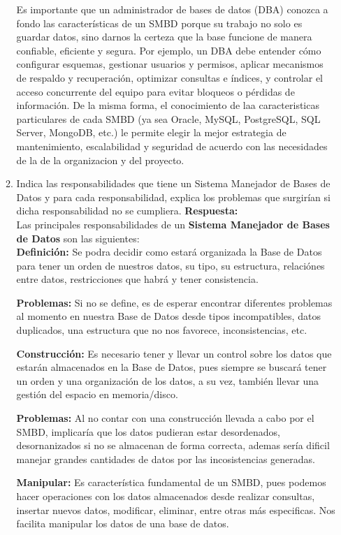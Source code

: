 \documentclass[12pt]{report}
\begin{document}
\begin{enumerate}[label=\textbf{\arabic*.}, leftmargin=*]
\begin{enumerate}[label=\textbf{\alph*.}, leftmargin=*, itemsep=1.0em]
    Es importante que un administrador de bases de datos (DBA) conozca a fondo las características de un SMBD porque su trabajo no solo es guardar datos, sino darnos la certeza que la base funcione de manera confiable, eficiente y segura. Por ejemplo, un DBA debe entender cómo configurar esquemas, gestionar usuarios y permisos, aplicar mecanismos de respaldo y recuperación, optimizar consultas e índices, y controlar el acceso concurrente del equipo para evitar bloqueos o pérdidas de información. De la misma forma, el conocimiento de laa caracteristicas particulares de cada SMBD (ya sea Oracle, MySQL, PostgreSQL, SQL Server, MongoDB, etc.) le permite elegir la mejor estrategia de mantenimiento, escalabilidad y seguridad de acuerdo con las necesidades de la de la organizacion y del proyecto.




\item Indica las responsabilidades que tiene un Sistema Manejador de Bases de Datos y para cada responsabilidad, explica los problemas que surgir\'ian si dicha responsabilidad no se cumpliera.
\textbf{Respuesta:}\\
Las principales responsabilidades de un \textbf{Sistema Manejador de Bases de Datos} son las siguientes:\\
\textbf{Definición:} Se podra decidir como estará organizada la Base de Datos para tener un orden de nuestros datos, su tipo, su estructura, relaciónes entre datos, restricciones que habrá y tener consistencia.

\hspace{0.3cm}\textbf{Problemas:} Si no se define, es de esperar encontrar diferentes problemas al momento en nuestra Base de Datos desde tipos incompatibles, datos duplicados, una estructura que no nos favorece, inconsistencias, etc.
    
    
\textbf{Construcción:}
Es necesario tener y llevar un control sobre los datos que estarán almacenados en la Base de Datos, pues siempre se buscará tener un orden y una organización de los datos, a su vez, también llevar una gestión del espacio en memoria/disco.

\hspace{0.3cm}\textbf{Problemas:} 
Al no contar con una construcción llevada a cabo por el SMBD, implicaría que los datos pudieran estar desordenados, desornanizados si no se almacenan de forma correcta, ademas sería dificil manejar grandes cantidades de datos por las incosistencias generadas. 

    
\textbf{Manipular:}
Es característica fundamental de un SMBD, pues podemos hacer operaciones con los datos almacenados desde realizar consultas, insertar nuevos datos, modificar, eliminar, entre otras más especificas. Nos facilita manipular los datos de una base de datos. 


\end{enumerate}
\end{enumerate}
\end{document}
